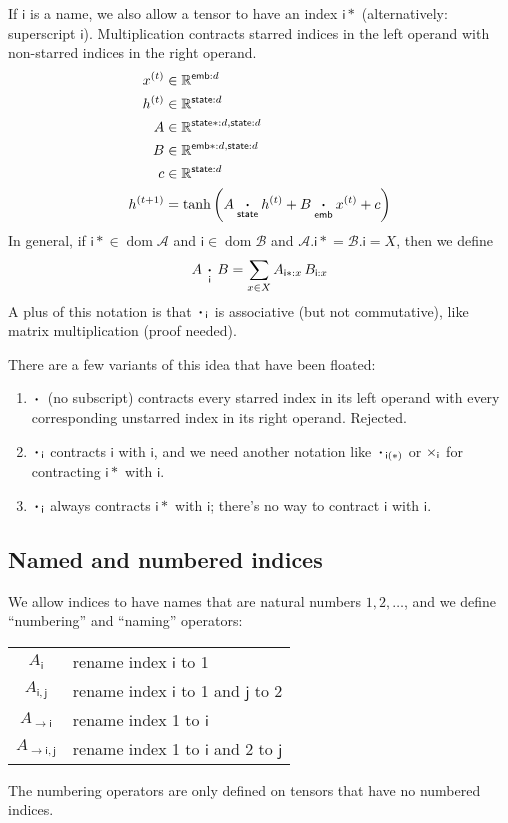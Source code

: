\documentclass{article}
\newcommand{\name}[1]{\mathsf{#1}}
\newcommand{\ndot}[1]{\mathbin{\mathop{\thinspace\boldsymbol\cdot\thinspace}\displaylimits_{\name{#1}}}}
\DeclareMathOperator{\tupledom}{dom}
\newcommand{\tupleproj}[2]{#1.#2}
\begin{document}
If $\name{i}$ is a name, we also allow a tensor to have an index $\name{i*}$ (alternatively: superscript $\name{i}$). Multiplication contracts starred indices in the left operand with non-starred indices in the right operand.
\begin{align*}
x^{(t)} &\in \mathbb{R}^{\name{emb}: d} \\
h^{(t)} &\in \mathbb{R}^{\name{state}: d} \\
A &\in \mathbb{R}^{\name{state*}: d, \name{state}: d} \\
B &\in \mathbb{R}^{\name{emb*}: d, \name{state}: d} \\
c &\in \mathbb{R}^{\name{state}: d} \\
h^{(t+1)} &= \tanh\left( A \ndot{state} h^{(t)} + B \ndot{emb} x^{(t)} + c \right) 
\end{align*}
In general, if $\name{i*} \in \tupledom \mathcal{A}$ and $\name{i} \in \tupledom \mathcal{B}$ and $\tupleproj{\mathcal{A}}{\name{i*}} = \tupleproj{\mathcal{B}}{\name{i}} = X$, then we define
\begin{equation*}
A \ndot{i} B = \sum_{x \in X} A_{\name{i*}: x} \, B_{\name{i}: x}
\end{equation*}
A plus of this notation is that $\ndot{i}$ is associative (but not commutative), like matrix multiplication (proof needed).

There are a few variants of this idea that have been floated:
\begin{enumerate}
\item $\ndot{}$ (no subscript) contracts every starred index in its left operand with every corresponding unstarred index in its right operand. Rejected.
\item $\ndot{i}$ contracts $\name{i}$ with $\name{i}$, and we need another notation like $\ndot{i(*)}$ or $\mathop\times\displaylimits_{\name{i}}$ for contracting $\name{i*}$ with $\name{i}$.
\item $\ndot{i}$ always contracts $\name{i*}$ with $\name{i}$; there's no way to contract $\name{i}$ with $\name{i}$.
\end{enumerate}

\subsection{Named and numbered indices}
\label{sec:tensorsoftensors}

We allow indices to have names that are natural numbers $1, 2, \ldots$, and we define ``numbering'' and ``naming'' operators:
\begin{center}
\begin{tabular}{cl}
$A_{\name{i}}$ & rename index $\name{i}$ to 1 \\
$A_{\name{i},\name{j}}$ & rename index $\name{i}$ to 1 and $\name{j}$ to 2 \\
$A_{\rightarrow\name{i}}$ & rename index 1 to $\name{i}$ \\
$A_{\rightarrow\name{i},\name{j}}$ & rename index 1 to $\name{i}$ and 2 to $\name{j}$
\end{tabular}
\end{center}
The numbering operators are only defined on tensors that have no numbered indices.
\end{document}
